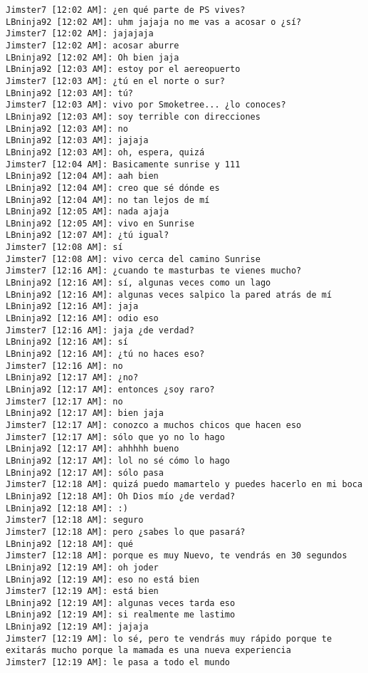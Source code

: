 \begin{verbatim}
Jimster7 [12:02 AM]: ¿en qué parte de PS vives?
LBninja92 [12:02 AM]: uhm jajaja no me vas a acosar o ¿sí?
Jimster7 [12:02 AM]: jajajaja
Jimster7 [12:02 AM]: acosar aburre 
LBninja92 [12:02 AM]: Oh bien jaja
LBninja92 [12:03 AM]: estoy por el aereopuerto
Jimster7 [12:03 AM]: ¿tú en el norte o sur?
LBninja92 [12:03 AM]: tú?
Jimster7 [12:03 AM]: vivo por Smoketree... ¿lo conoces? 
LBninja92 [12:03 AM]: soy terrible con direcciones
LBninja92 [12:03 AM]: no
LBninja92 [12:03 AM]: jajaja
LBninja92 [12:03 AM]: oh, espera, quizá
Jimster7 [12:04 AM]: Basicamente sunrise y 111
LBninja92 [12:04 AM]: aah bien
LBninja92 [12:04 AM]: creo que sé dónde es
LBninja92 [12:04 AM]: no tan lejos de mí
LBninja92 [12:05 AM]: nada ajaja
LBninja92 [12:05 AM]: vivo en Sunrise 
LBninja92 [12:07 AM]: ¿tú igual?
Jimster7 [12:08 AM]: sí 
Jimster7 [12:08 AM]: vivo cerca del camino Sunrise
Jimster7 [12:16 AM]: ¿cuando te masturbas te vienes mucho?
LBninja92 [12:16 AM]: sí, algunas veces como un lago 
LBninja92 [12:16 AM]: algunas veces salpico la pared atrás de mí
LBninja92 [12:16 AM]: jaja
LBninja92 [12:16 AM]: odio eso
Jimster7 [12:16 AM]: jaja ¿de verdad?
LBninja92 [12:16 AM]: sí
LBninja92 [12:16 AM]: ¿tú no haces eso?
Jimster7 [12:16 AM]: no
LBninja92 [12:17 AM]: ¿no?
LBninja92 [12:17 AM]: entonces ¿soy raro?
Jimster7 [12:17 AM]: no
LBninja92 [12:17 AM]: bien jaja
Jimster7 [12:17 AM]: conozco a muchos chicos que hacen eso
Jimster7 [12:17 AM]: sólo que yo no lo hago
LBninja92 [12:17 AM]: ahhhhh bueno
LBninja92 [12:17 AM]: lol no sé cómo lo hago
LBninja92 [12:17 AM]: sólo pasa
Jimster7 [12:18 AM]: quizá puedo mamartelo y puedes hacerlo en mi boca
LBninja92 [12:18 AM]: Oh Dios mío ¿de verdad?
LBninja92 [12:18 AM]: :)
Jimster7 [12:18 AM]: seguro
Jimster7 [12:18 AM]: pero ¿sabes lo que pasará?
LBninja92 [12:18 AM]: qué
Jimster7 [12:18 AM]: porque es muy Nuevo, te vendrás en 30 segundos
LBninja92 [12:19 AM]: oh joder
LBninja92 [12:19 AM]: eso no está bien
Jimster7 [12:19 AM]: está bien
LBninja92 [12:19 AM]: algunas veces tarda eso
LBninja92 [12:19 AM]: si realmente me lastimo
LBninja92 [12:19 AM]: jajaja
Jimster7 [12:19 AM]: lo sé, pero te vendrás muy rápido porque te exitarás mucho porque la mamada es una nueva experiencia
Jimster7 [12:19 AM]: le pasa a todo el mundo

\end{verbatim}